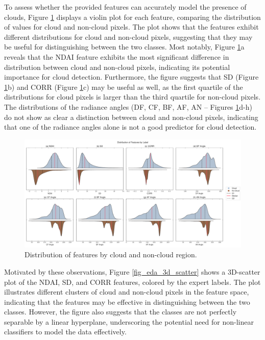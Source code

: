 \documentclass[11pt,letterpaper]{article}
\begin{document}
To assess whether the provided features can accurately model the presence of clouds, Figure \ref{fig_eda_feature_distrib} displays a violin plot for each feature, comparing the distribution of values for cloud and non-cloud pixels. The plot shows that the features exhibit different distributions for cloud and non-cloud pixels, suggesting that they may be useful for distinguishing between the two classes. Most notably, Figure \ref{fig_eda_feature_distrib}a reveals that the NDAI feature exhibits the most significant difference in distribution between cloud and
non-cloud pixels, indicating its potential importance for cloud detection. Furthermore, the figure suggests that SD (Figure \ref{fig_eda_feature_distrib}b) and CORR (Figure \ref{fig_eda_feature_distrib}c) may be useful as well, as the first quartile of the distributions for cloud pixels is larger than the third quartile for non-cloud pixels. The distributions of the radiance angles (DF, CF, BF, AF, AN – Figures \ref{fig_eda_feature_distrib}d-h) do not show as clear a distinction between cloud and non-cloud pixels, indicating that one of the radiance angles alone is not a good predictor for cloud detection.
\begin{figure}[H]
    \centering
    \includegraphics[width=\linewidth]{figs/eda_feature_distribution.pdf}
    \caption{Distribution of features by cloud and non-cloud region.}
    \label{fig_eda_feature_distrib}
\end{figure}

Motivated by these observations, Figure \ref{fig_eda_3d_scatter} shows a 3D-scatter plot of the NDAI, SD, and CORR features, colored by the expert labels. The plot illustrates different clusters of cloud and non-cloud pixels in the feature space, indicating that the features may be effective in distinguishing between the two classes. However, the figure also suggests that the classes are not perfectly separable by a linear hyperplane, underscoring the potential need for non-linear classifiers to model the data effectively.
\end{document}
